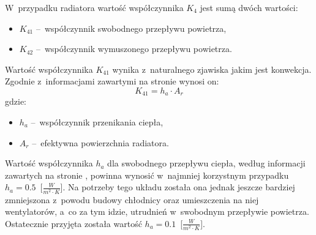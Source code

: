 W~przypadku radiatora wartość współczynnika $K_4$ jest sumą dwóch wartości:
\begin{itemize}
    \item $K_{41}$ --~współczynnik swobodnego przepływu powietrza,
    \item $K_{42}$ --~współczynnik wymuszonego przepływu powietrza.
\end{itemize}

Wartość współczynnika $K_{41}$ wynika z~naturalnego zjawiska jakim jest
konwekcja. Zgodnie z~informacjami zawartymi na stronie \cite{CHT} wynosi on:
\begin{equation}
    K_{41} = h_a \cdot A_r
    \label{equ:k41}
\end{equation}
gdzie:
\begin{itemize}
    \item $h_a$ --~współczynnik przenikania ciepła,
    \item $A_r$ --~efektywna powierzchnia radiatora.
\end{itemize}
Wartość współczynnika $h_a$ dla swobodnego przepływu ciepła, według informacji
zawartych na stronie \cite{CHT}, powinna wynosić w~najmniej korzystnym przypadku
$h_a = 0.5$~[$\frac{W}{m^2 \cdot K}$]. Na potrzeby tego układu została ona
jednak jeszcze bardziej zmniejszona z~powodu budowy chłodnicy oraz umieszczenia
na niej wentylatorów, a~co za tym idzie, utrudnień w~swobodnym przepływie
powietrza. Ostatecznie przyjęta została wartość $h_a = 0.1$~[$\frac{W}{m^2
\cdot K}$].

